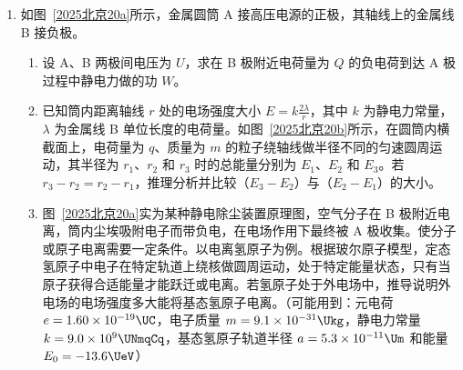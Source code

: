 \documentclass[\gkver]{gaokaozhenti}
\begin{document}
\begin{enumerate}
{又 $\Delta p = m\Delta v$，$m = \rho S\Delta v \cdot \Delta t$

代入可得 $F = \rho S\Delta v^{2}$

又 $\Delta v \propto u$，可知 $F \propto u^{2}$

即 $\alpha = 2$
}

\item
如图~\ref{2025北京20a}所示，金属圆筒 A 接高压电源的正极，其轴线上的金属线 B 接负极。
\begin{enumerate}
	\item
	设 A、B 两极间电压为 $U$，求在 B 极附近电荷量为 $Q$ 的负电荷到达 A 极过程中静电力做的功 $W$。
	\item
	已知筒内距离轴线 $r$ 处的电场强度大小 $E = k\frac{2\lambda}{r}$，其中 $k$ 为静电力常量，$\lambda$ 为金属线 B 单位长度的电荷量。如图~\ref{2025北京20b}所示，在圆筒内横截面上，电荷量为 $q$、质量为 $m$ 的粒子绕轴线做半径不同的匀速圆周运动，其半径为 $r_{1}$、$r_{2}$ 和 $r_{3}$ 时的总能量分别为 $E_{1}$、$E_{2}$ 和 $E_{3}$。若 $r_{3} - r_{2} = r_{2} - r_{1}$，推理分析并比较（$E_{3} - E_{2}$）与（$E_{2} - E_{1}$）的大小。
	\item
	图~\ref{2025北京20a}实为某种静电除尘装置原理图，空气分子在 B 极附近电离，筒内尘埃吸附电子而带负电，在电场作用下最终被 A 极收集。使分子或原子电离需要一定条件。以电离氢原子为例。根据玻尔原子模型，定态氢原子中电子在特定轨道上绕核做圆周运动，处于特定能量状态，只有当原子获得合适能量才能跃迁或电离。若氢原子处于外电场中，推导说明外电场的电场强度多大能将基态氢原子电离。（可能用到：元电荷 $e = 1.60 \times 10^{-19} \UC$，电子质量 $m = 9.1 \times 10^{-31} \Ukg$，静电力常量 $k = 9.0 \times 10^{9} \UNmqCq$，基态氢原子轨道半径 $a = 5.3 \times 10^{-11} \Um$ 和能量 $E_{0} = -13.6 \UeV$）
\end{enumerate}


\end{enumerate}
\end{document}
